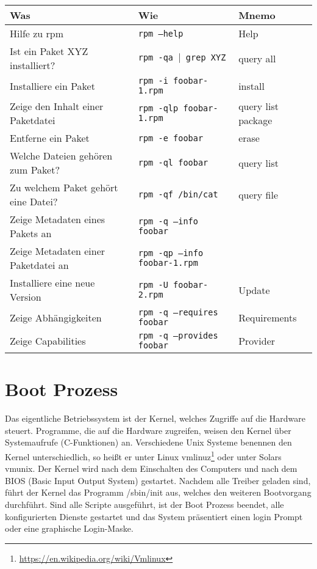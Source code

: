 \documentclass[titlepage,a4paper]{article}
\begin{document}
\noindent
\begin{tabular}{| l | l | l |}
\hline
\textbf{Was} & \textbf{Wie} & \textbf{Mnemo} \\ \hline
Hilfe zu rpm & \texttt{rpm --help} & Help \\ \hline
Ist ein Paket XYZ installiert? & \texttt{rpm -qa $|$ grep XYZ} & query all  \\ \hline
Installiere ein Paket & \texttt{rpm -i foobar-1.rpm} & install  \\ \hline
Zeige den Inhalt einer Paketdatei & \texttt{rpm -qlp foobar-1.rpm} & query list package  \\ \hline
Entferne ein Paket & \texttt{rpm -e foobar} & erase  \\ \hline
Welche Dateien gehören zum Paket? & \texttt{rpm -ql foobar} & query list  \\ \hline
Zu welchem Paket gehört eine Datei? & \texttt{rpm -qf /bin/cat} & query file  \\ \hline
Zeige Metadaten eines Pakets an & \texttt{rpm -q --info foobar} & \\ \hline
Zeige Metadaten einer Paketdatei an & \texttt{rpm -qp --info foobar-1.rpm} & \\ \hline
Installiere eine neue Version & \texttt{rpm -U foobar-2.rpm} & Update  \\ \hline
Zeige Abhängigkeiten & \texttt{rpm -q --requires foobar} & Requirements \\ \hline
Zeige Capabilities & \texttt{rpm -q --provides foobar} & Provider \\
\hline
\end{tabular}

\section{Boot Prozess}
\label{sec:boot}

Das eigentliche Betriebssystem ist der Kernel, welches Zugriffe auf die
Hardware steuert.  Programme, die auf die Hardware zugreifen, weisen den
Kernel über Systemaufrufe (C-Funktionen) an.  Verschiedene Unix Systeme
benennen den Kernel unterschiedlich, so heißt er unter Linux 
vmlinuz\footnote{\url{https://en.wikipedia.org/wiki/Vmlinux}} oder
unter Solars vmunix.  Der Kernel wird nach
dem Einschalten des Computers und nach dem BIOS (Basic Input Output System)
gestartet.  Nachdem alle Treiber geladen sind,  führt der Kernel das Programm
/sbin/init aus, welches den weiteren Bootvorgang durchführt.
Sind alle Scripte ausgeführt, ist der Boot
Prozess beendet, alle konfigurierten Dienste gestartet und das System
präsentiert einen login Prompt oder eine graphische Login-Maske.
\end{document}
